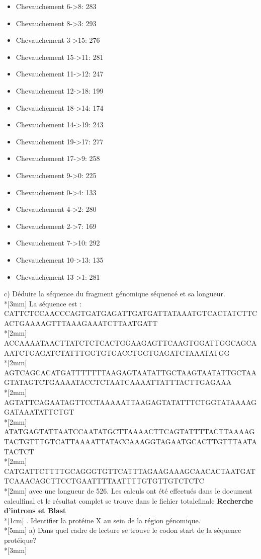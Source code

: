 \documentclass[11pt, letterpaper]{article}
\begin{document}
{\begin{itemize}
\item Chevauchement 6->8: 283
\item Chevauchement 8->3: 293
\item Chevauchement 3->15: 276
\item Chevauchement 15->11: 281
\item Chevauchement 11->12: 247
\item Chevauchement 12->18: 199
\item Chevauchement 18->14: 174
\item Chevauchement 14->19: 243
\item Chevauchement 19->17: 277
\item Chevauchement 17->9: 258
\item Chevauchement 9->0: 225
\item Chevauchement 0->4: 133
\item Chevauchement 4->2: 280
\item Chevauchement 2->7: 169
\item Chevauchement 7->10: 292
\item Chevauchement 10->13: 135
\item Chevauchement 13->1: 281
\end{itemize}
c) Déduire la séquence du fragment génomique séquencé et sa longueur. \\*[3mm]
La séquence est :  CATTCTCCAACCCAGTGATGAGATTGATGATTATAAATGTCACTATCTTCACTGAAAAGTTTAAAGAAATCTTAATGATT\\*[2mm]
ACCAAAATAACTTATCTCTCACTGGAAGAGTTCAAGTGGATTGGCAGCAAATCTGAGATCTATTTGGTGTGACCTGGTGAGATCTAAATATGG\\*[2mm]
AGTCAGCACATGATTTTTTTAAGAGTAATATTGCTAAGTAATATTGCTAAGTATAGTCTGAAAATACCTCTAATCAAAATTATTTACTTGAGAAA\\*[2mm]
AGTATTCAGAATAGTTCCTAAAAATTAAGAGTATATTTCTGGTATAAAAGGATAAATATTCTGT
\\*[2mm]
ATATGAGTATTAATCCAATATGCTTAAAACTTCAGTATTTTACTTAAAAGTACTGTTTGTCATTAAAATTATACCAAAGGTAGAATGCACTTGTTTAATATACTCT
\\*[2mm]
CATGATTCTTTTGCAGGGTGTTCATTTAGAAGAAAGCAACACTAATGATTCAAACAGCTTCCTGAATTTTAATTTTGTGTTGTCTCTC\\*[2mm]
avec une longueur de 526. Les calculs ont été effectués dans le document calculfinal et le résultat complet se trouve dans le fichier totalefinale
\newpage
\textbf{Recherche d'introns et Blast} \\*[1cm]
. Identifier la protéine X au sein de la région génomique. \\*[5mm]
a) Dans quel cadre de lecture se trouve le codon start de la séquence protéique? \\*[3mm]
}
\end{document}
